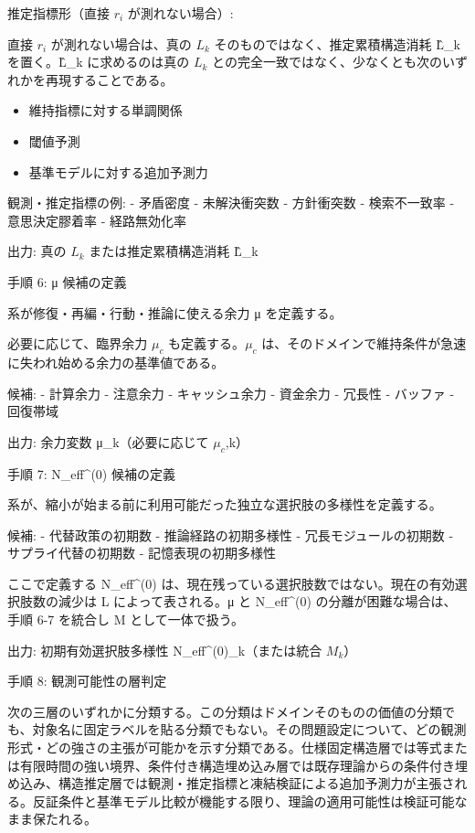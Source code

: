 \documentclass[12pt,a4paper]{article}
\begin{document}
推定指標形（直接 \(r_{i}\) が測れない場合）:

直接 \(r_{i}\) が測れない場合は、真の \(L_{k}\) そのものではなく、推定累積構造消耗 L̂\_k を置く。L̂\_k に求めるのは真の \(L_{k}\) との完全一致ではなく、少なくとも次のいずれかを再現することである。

\begin{itemize}
\tightlist
\item
  維持指標に対する単調関係
\item
  閾値予測
\item
  基準モデルに対する追加予測力
\end{itemize}

観測・推定指標の例: - 矛盾密度 - 未解決衝突数 - 方針衝突数 - 検索不一致率 - 意思決定膠着率 - 経路無効化率

出力: 真の \(L_{k}\) または推定累積構造消耗 L̂\_k

手順 6: μ 候補の定義

系が修復・再編・行動・推論に使える余力 μ を定義する。

必要に応じて、臨界余力 \(\mu_{c}\) も定義する。\(\mu_{c}\) は、そのドメインで維持条件が急速に失われ始める余力の基準値である。

候補: - 計算余力 - 注意余力 - キャッシュ余力 - 資金余力 - 冗長性 - バッファ - 回復帯域

出力: 余力変数 μ\_k（必要に応じて \(\mu_{c}\),k）

手順 7: N\_eff\^{}(0) 候補の定義

系が、縮小が始まる前に利用可能だった独立な選択肢の多様性を定義する。

候補: - 代替政策の初期数 - 推論経路の初期多様性 - 冗長モジュールの初期数 - サプライ代替の初期数 - 記憶表現の初期多様性

ここで定義する N\_eff\^{}(0) は、現在残っている選択肢数ではない。現在の有効選択肢数の減少は L によって表される。μ と N\_eff\^{}(0) の分離が困難な場合は、手順 6-7 を統合し M として一体で扱う。

出力: 初期有効選択肢多様性 N\_eff\^{}(0)\_k（または統合 \(M_{k}\)）

手順 8: 観測可能性の層判定

次の三層のいずれかに分類する。この分類はドメインそのものの価値の分類でも、対象名に固定ラベルを貼る分類でもない。その問題設定について、どの観測形式・どの強さの主張が可能かを示す分類である。仕様固定構造層では等式または有限時間の強い境界、条件付き構造埋め込み層では既存理論からの条件付き埋め込み、構造推定層では観測・推定指標と凍結検証による追加予測力が主張される。反証条件と基準モデル比較が機能する限り、理論の適用可能性は検証可能なまま保たれる。
\end{document}

